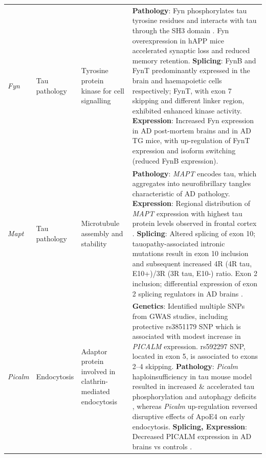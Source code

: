 \begin{landscape}
\begin{longtable}[c]{p{1cm}p{2cm}p{4cm}p{19cm}}
			\centering \textit{Fyn} &
			\centering Tau pathology  &
			\centering Tyrosine protein kinase for cell signalling &			
			\tabitem \textbf{Pathology}: Fyn phosphorylates tau tyrosine residues and interacts with tau through the SH3 domain \cite{Bhaskar2010}. \newline 
			\tabitem Fyn overexpression in hAPP mice accelerated synaptic loss and reduced memory retention\cite{Chin2005}. \newline
			\tabitem \textbf{Splicing}: FynB and FynT predominantly expressed in the brain and haemapoietic cells respectively; FynT, with exon 7 skipping and different linker region, exhibited enhanced kinase activity.\newline
			\tabitem \textbf{Expression}: Increased Fyn expression in AD post-mortem brains\cite{Lee2016b} and in AD TG mice\cite{Low2021}, with up-regulation of FynT expression and isoform switching (reduced FynB expression)\cite{Lee2016b}. \\
			\hdashline[0.5pt/5pt]
			
			\centering \textit{Mapt} &
			\centering Tau pathology  &
			\centering Microtubule assembly and stability  &			
			\tabitem  \textbf{Pathology}: \textit{MAPT} encodes tau, which aggregates into neurofibrillary tangles characteristic of AD pathology. \newline 
			\tabitem \textbf{Expression}: Regional distribution of \textit{MAPT} expression with highest tau protein levels observed in frontal cortex \cite{Trabzuni2012}. \newline
			\tabitem \textbf{Splicing}: Altered splicing of exon 10; tauopathy-associated intronic mutations result in exon 10 inclusion and subsequent increased 4R (4R tau, E10+)/3R (3R tau, E10-) ratio\cite{Bowles2022}. \newline
			\tabitem Exon 2 inclusion; differential expression of exon 2 splicing regulators in AD brains \cite{Bowles2022}. \\
			\hdashline[0.5pt/5pt]
			
			\centering \textit{Picalm} &
			\centering Endocytosis  &
			\centering Adaptor protein involved in clathrin-mediated endocytosis &	
			\tabitem \textbf{Genetics}: Identified multiple SNPs from GWAS studies, including protective rs3851179 SNP which is associated with modest increase in \textit{PICALM} expression. \newline 
			\tabitem rs592297 SNP, located in exon 5, is associated to exons 2–4 skipping\cite{Parikh2014}. \newline
			\tabitem \textbf{Pathology}: \textit{Picalm} haploinsufficiency in tau mouse model resulted in increased \& accelerated tau phosphorylation and autophagy deficits \cite{Ando2020}, whereas \textit{Picalm} up-regulation reversed disruptive effects of ApoE4 on early endocytosis.\cite{Narayan2020} \newline
			\tabitem \textbf{Splicing, Expression}: Decreased PICALM expression in AD brains vs controls \cite{Ando2016}. \\


\end{longtable}
\end{landscape}
